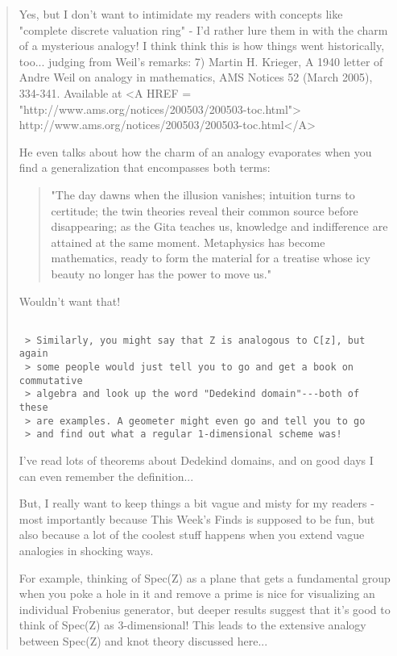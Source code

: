 \begin{quote}
 Yes, but I don't want to intimidate my readers with concepts
 like "complete discrete valuation ring" - I'd rather lure them 
 in with the charm of a mysterious analogy!  I think think this 
 is how things went historically, too... judging from Weil's
 remarks: 
7) Martin H. Krieger, A 1940 letter of Andre Weil on analogy in 
 mathematics, AMS Notices 52 (March 2005), 334-341. Available 
 at <A HREF = "http://www.ams.org/notices/200503/200503-toc.html"> http://www.ams.org/notices/200503/200503-toc.html</A>

 He even talks about how the charm of an analogy evaporates when
 you find a generalization that encompasses both terms:

\begin{quote}
  "The 
  day dawns when the illusion vanishes; intuition turns to certitude; 
  the twin theories reveal their common source before disappearing; as 
  the Gita teaches us, knowledge and indifference are attained at the 
  same moment. Metaphysics has become mathematics, ready to form the 
  material for a treatise whose icy beauty no longer has the power to 
  move us."
\end{quote}

 Wouldn't want that!


\begin{verbatim}

 > Similarly, you might say that Z is analogous to C[z], but again 
 > some people would just tell you to go and get a book on commutative 
 > algebra and look up the word "Dedekind domain"---both of these 
 > are examples. A geometer might even go and tell you to go 
 > and find out what a regular 1-dimensional scheme was!
\end{verbatim}
    

 I've read lots of theorems about Dedekind domains, and on good
 days I can even remember the definition... 

 But, I really want to keep things a bit vague and misty for my 
 readers - most importantly because This Week's Finds is supposed
 to be fun, but also because a lot of the coolest stuff happens 
 when you extend vague analogies in shocking ways.  

 For example, thinking of Spec(Z) as a plane that gets a fundamental 
 group when you poke a hole in it and remove a prime is nice
 for visualizing an individual Frobenius generator, but 
 deeper results suggest that it's good to think of Spec(Z) 
 as 3-dimensional!  This leads to the extensive analogy between 
 Spec(Z) and knot theory discussed here...


\end{quote}
